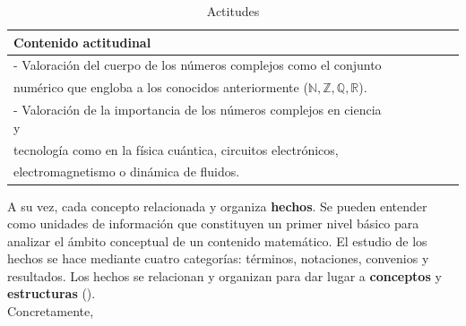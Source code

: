 \documentclass[../main.tex]{memoir}
\begin{document}
\begin{table}[H]
	\centering
	\begin{tabular}{lccccc}
		\toprule
		\hspace{4cm}Contenido actitudinal \\
		\midrule
		- Valoración del cuerpo de los números complejos como el conjunto \\ \hspace{0.2cm} numérico que engloba a los conocidos anteriormente ($\mathbb{N}, \mathbb{Z}, \mathbb{Q}, \mathbb{R}$). \\
		- Valoración de la importancia de los números complejos en ciencia y \\ \hspace{0.2cm} tecnología como en la física cuántica, circuitos electrónicos, \\ \hspace{0.2cm} electromagnetismo o dinámica de fluidos. \\
		\bottomrule
	\end{tabular}
	\caption{Actitudes}
	\label{tab:actitudes}
\end{table}


A su vez, cada concepto relacionada y organiza \textbf{hechos}. Se pueden entender como unidades de información que constituyen un primer nivel básico para analizar el ámbito conceptual de un contenido matemático. El estudio de los hechos se hace mediante cuatro categorías: términos, notaciones, convenios y resultados. Los hechos se relacionan y organizan para dar lugar a \textbf{conceptos} y \textbf{estructuras} (\cite{rico2016}). \\



Concretamente,
\end{document}
